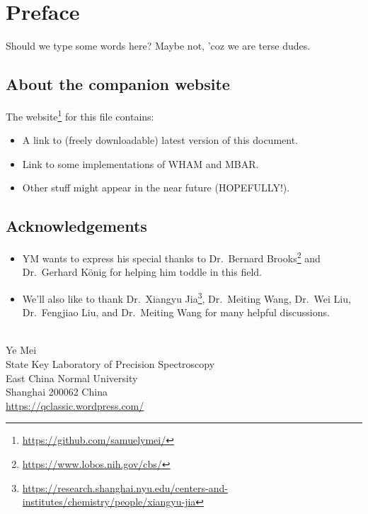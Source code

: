 \chapter*{Preface}
Should we type some words here? Maybe not, 'coz we are terse dudes.

\section*{About the companion website}
The website\footnote{\url{https://github.com/samuelymei/}} for this file contains:
\begin{itemize}
  \item A link to (freely downloadable) latest version of this document.
  \item Link to some implementations of WHAM and MBAR.
  \item Other stuff might appear in the near future (HOPEFULLY!).
\end{itemize}

\section*{Acknowledgements}
\begin{itemize}
\item YM wants to express his special thanks to Dr.~Bernard Brooks\footnote{\url{https://www.lobos.nih.gov/cbs/}} and Dr.~Gerhard K\"onig for helping him toddle in this field.
\item We'll also like to thank Dr.~Xiangyu Jia\footnote{\url{https://research.shanghai.nyu.edu/centers-and-institutes/chemistry/people/xiangyu-jia}}, Dr.~Meiting Wang, Dr.~Wei Liu, Dr.~Fengjiao Liu, and Dr.~Meiting Wang for many helpful discussions.
\end{itemize}
\mbox{}\\
\noindent Ye Mei \\
\noindent State Key Laboratory of Precision Spectroscopy\\
\noindent East China Normal University\\
\noindent Shanghai 200062 China\\
\noindent \url{https://qclassic.wordpress.com/}
